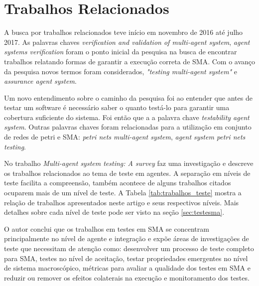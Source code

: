 \chapter{Trabalhos Relacionados}

A busca por trabalhos relacionados teve início em novembro de 2016 até julho 2017. As palavras chaves \textit{verification and validation of multi-agent system}, \textit{agent systems verification} foram o ponto inicial da pesquisa na busca de encontrar trabalhos relatando formas de garantir a execução correta de SMA. Com o avanço da pesquisa novos termos foram considerados,  \textit{"testing multi-agent system"} e \textit{assurance agent system}. 

Um novo entendimento sobre o caminho da pesquisa foi ao entender que antes de testar um software é necessário saber o quanto testá-lo para garantir uma cobertura suficiente do sistema. Foi então que a a palavra chave \textit{testability agent system}. Outras palavras chaves foram relacionadas para a utilização em conjunto de redes de petri e SMA: \textit{petri nets multi-agent system}, \textit{agent system petri nets testing}.

No trabalho \textit{Multi-agent system testing: A survey} \citet{houhamdi2011multi} faz uma investigação e descreve os trabalhos relacionados ao tema de teste em agentes. A separação em níveis de teste facilita a compreensão, também acontece de alguns trabalhos citados ocuparem mais de um nível de teste. A Tabela \ref{tab:trabalhos_teste} mostra a relação de trabalhos apresentados neste artigo e seus respectivos níveis. Mais detalhes sobre cada nível de teste pode ser visto na seção \ref{sec:testesma}.

O autor conclui que os trabalhos em testes em SMA se concentram principalmente no nível de agente e integração e expõe áreas de investigações de teste que necessitam de atenção como: desenvolver um processo de teste completo para SMA, testes no nível de aceitação, testar propriedades emergentes no nível de sistema macroscópico, métricas para avaliar a qualidade dos testes em SMA e reduzir ou remover os efeitos colaterais na execução e monitoramento dos testes.

